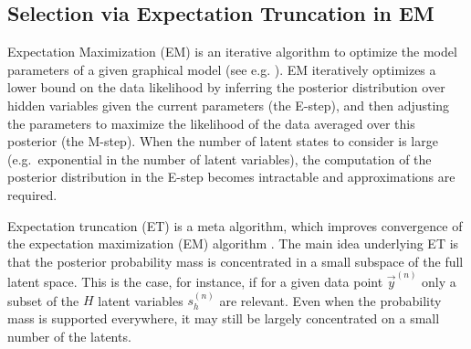 \subsection{Selection via Expectation Truncation in EM}
Expectation Maximization (EM) is an iterative algorithm to optimize the model parameters of a given graphical model (see e.g. \citep{DempsterEtAl1977, NealHinton1998}).
EM iteratively optimizes a lower bound on the data likelihood by inferring the
posterior distribution over hidden variables given the current parameters (the
E-step), and then adjusting the parameters to maximize the likelihood of the
data averaged over this posterior (the M-step).
%
When the number of latent states to consider is large (e.g.\ exponential in the
number of latent variables), the computation of the posterior distribution in
the E-step becomes intractable and approximations are required.


%
Expectation truncation (ET) is a meta algorithm, which improves convergence of the expectation maximization (EM) algorithm \citep{LuckeEggert2010}.
%
The main idea underlying ET is that the posterior probability mass is concentrated in a small subspace of the full latent space.
This is the case, for instance, if for a given data point $\vec{y}^{(n)}$ 
only a subset of the $H$ latent variables $s_h^{(n)}$ are relevant. 
Even when the probability mass is supported everywhere, it may still be largely concentrated on a small number of the latents.

